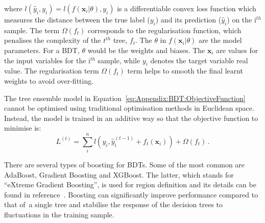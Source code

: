 where $l(\hat{y}_{i}, y_{i})=l(f(\bm{x}_{i}|\theta), y_{i})$ is a differentiable convex
loss function which measures the distance between the true label ($y_i$) and its prediction ($\hat{y}_{i}$) on the i$^{th}$ sample.
 The term
$\Omega(f_{t})$ corresponds to the regularisation function, which penalises the complexity of the $t^{th}$ tree, $f_t$.
The $\theta$ in $f(\bm{x}_{i}|\theta)$ are the model parameters. For a BDT, $\theta$ would be the weights
and biases. The $\bm{x}_i$ are values for the input 
variables for the i$^{th}$ sample, while $y_{i}$ denotes the target variable real value. 
The regularisation term $\Omega(f_{t})$ term helps to smooth the final learnt weights to avoid
over-fitting. %

The tree ensemble model in Equation~\ref{eq:Appendix:BDT:ObjectiveFunction} cannot be optimised using 
traditional optimisation methods in Euclidean space. 
Instead, the model is trained in an additive way so that the objective function to minimise is:
\begin{equation}
\label{eq:Appendix:BDT:ObjectiveFunction_alternative}
	L^{(t)} =  \sum_{i}^n l(y_i, \hat{y}_i^{(t-1)} + f_t(\bm{x}_i)) + \Omega (f_t) \,.
\end{equation}

There are several types of boosting for BDTs. Some of the most common are AdaBoost, Gradient Boosting and XGBoost. 
The latter, which stands for ``eXtreme Gradient Boosting'', is used 
for region definition and its details can be found in reference~\cite{Chen_2016}.
Boosting can significantly improve performance compared to that of a single tree and stabilise 
the response of the decision trees to fluctuations in the training sample.



